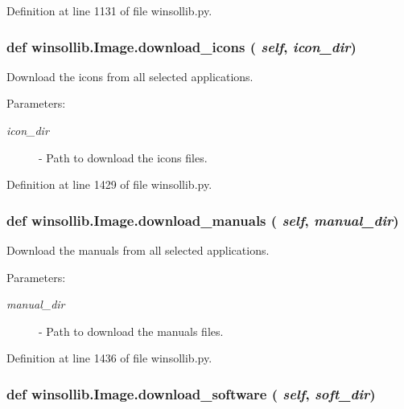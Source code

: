 Definition at line 1131 of file winsollib.py.\hypertarget{classwinsollib_1_1Image_611073a78a6eb928cf5211ce15b058e9}{
\subsubsection[download\_\-icons]{\setlength{\rightskip}{0pt plus 5cm}def winsollib.Image.download\_\-icons ( {\em self},  {\em icon\_\-dir})}}
\label{classwinsollib_1_1Image_611073a78a6eb928cf5211ce15b058e9}


Download the icons from all selected applications. 

\begin{Desc}
\item[Parameters:]
\begin{description}
\item[{\em icon\_\-dir}]- Path to download the icons files. \end{description}
\end{Desc}


Definition at line 1429 of file winsollib.py.\hypertarget{classwinsollib_1_1Image_02f8176cede60d9e12978645a676a280}{
\subsubsection[download\_\-manuals]{\setlength{\rightskip}{0pt plus 5cm}def winsollib.Image.download\_\-manuals ( {\em self},  {\em manual\_\-dir})}}
\label{classwinsollib_1_1Image_02f8176cede60d9e12978645a676a280}


Download the manuals from all selected applications. 

\begin{Desc}
\item[Parameters:]
\begin{description}
\item[{\em manual\_\-dir}]- Path to download the manuals files. \end{description}
\end{Desc}


Definition at line 1436 of file winsollib.py.\hypertarget{classwinsollib_1_1Image_fb6629034f715f62610e22accda9a21e}{
\subsubsection[download\_\-software]{\setlength{\rightskip}{0pt plus 5cm}def winsollib.Image.download\_\-software ( {\em self},  {\em soft\_\-dir})}}
\label{classwinsollib_1_1Image_fb6629034f715f62610e22accda9a21e}


